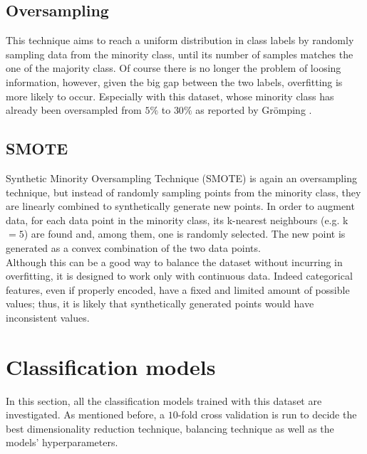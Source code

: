 \documentclass[letterpaper]{article}
\begin{document}
	\subsection{Oversampling}
	This technique aims to reach a uniform distribution in class labels by randomly sampling data from the minority class, until its number of samples matches the one of the majority class. Of course there is no longer the problem of loosing information, however, given the big gap between the two labels, overfitting is more likely to occur. Especially with this dataset, whose minority class has already been oversampled from $5\%$ to $30\%$ as reported by Grömping \cite{gromping}.
	\subsection{SMOTE}
	Synthetic Minority Oversampling Technique (SMOTE) is again an oversampling technique, but instead of randomly sampling points from the minority class, they are linearly combined to synthetically generate new points. In order to augment data, for each data point in the minority class, its k-nearest neighbours (e.g. k$=5$) are found and, among them, one is randomly selected. The new point is generated as a convex combination of the two data points. \\
	Although this can be a good way to balance the dataset without incurring in overfitting, it is designed to work only with continuous data. Indeed categorical features, even if properly encoded, have a fixed and limited amount of possible values; thus, it is likely that synthetically generated points would have inconsistent values. 
	
	\section{Classification models} \label{classification}
	In this section, all the classification models trained with this dataset are investigated. As mentioned before, a $10$-fold cross validation is run to decide the best dimensionality reduction technique, balancing technique as well as the models' hyperparameters. 
\end{document}
